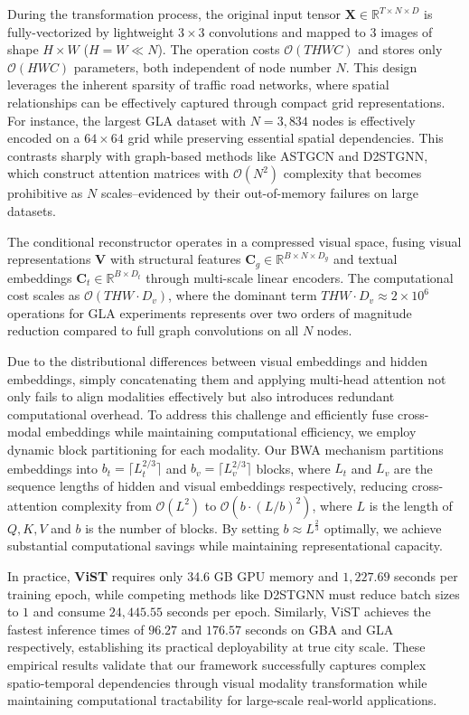 During the transformation process, the original input tensor $\mathbf{X}\in\mathbb{R}^{T\times N\times D}$ is fully-vectorized by lightweight $3{\times}3$ convolutions and mapped to 3 images of shape $H\times W$ ($H=W\ll N$). The operation costs $\mathcal{O}(THWC)$ and stores only $\mathcal{O}(HWC)$ parameters, both independent of node number $N$. 
This design leverages the inherent sparsity of traffic road networks, where spatial relationships can be effectively captured through compact grid representations. For instance, the largest GLA dataset with $N = 3{,}834$ nodes is effectively encoded on a $64 \times 64$ grid while preserving essential spatial dependencies. This contrasts sharply with graph-based methods like ASTGCN and D2STGNN, which construct attention matrices with $\mathcal{O}(N^2)$ complexity that becomes prohibitive as $N$ scales--evidenced by their out-of-memory failures on large datasets.

The conditional reconstructor operates in a compressed visual space, fusing visual representations $\mathbf{V}$ with structural features $\mathbf{C}_g \in \mathbb{R}^{B \times N \times D_g}$ and textual embeddings $\mathbf{C}_t \in \mathbb{R}^{B \times D_t}$ through multi-scale linear encoders. The computational cost scales as $\mathcal{O}(THW \cdot D_v)$, where the dominant term $THW \cdot D_v \approx 2 \times 10^6$ operations for GLA experiments represents over two orders of magnitude reduction compared to full graph convolutions on all $N$ nodes.

Due to the distributional differences between visual embeddings and hidden embeddings, simply concatenating them and applying multi-head attention not only fails to align modalities effectively but also introduces redundant computational overhead. 
To address this challenge and efficiently fuse cross-modal embeddings while maintaining computational efficiency, we employ dynamic block partitioning for each modality. 
Our BWA mechanism partitions embeddings into $b_t = \lceil L_t^{2/3}\rceil$ and $b_v = \lceil L_v^{2/3}\rceil$ blocks, where $L_t$ and $L_v$ are the sequence lengths of hidden and visual embeddings respectively, reducing cross-attention complexity from $\mathcal{O}(L^2)$ to $\mathcal{O}(b \cdot (L/b)^2)$, where $L$ is the length of $Q,K,V$ and $b$ is the number of blocks. 
By setting $b\approx L^{\frac{2}{3}}$ optimally, we achieve substantial computational savings while maintaining representational capacity.

In practice, \textbf{ViST} requires only 34.6 GB GPU memory and $1{,}227.69$ seconds per training epoch, while competing methods like D2STGNN must reduce batch sizes to $1$ and consume $24{,}445.55$ seconds per epoch. Similarly, ViST achieves the fastest inference times of $96.27$ and $176.57$ seconds on GBA and GLA respectively, establishing its practical deployability at true city scale. These empirical results validate that our framework successfully captures complex spatio-temporal dependencies through visual modality transformation while maintaining computational tractability for large-scale real-world applications.

